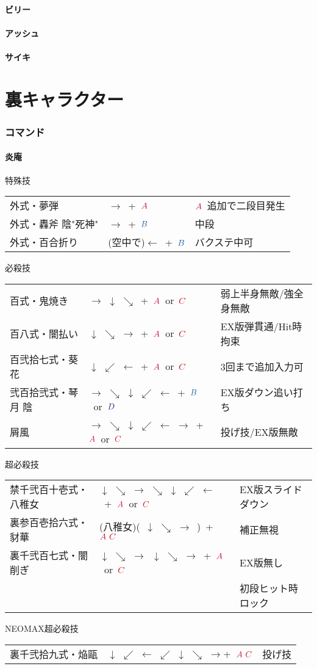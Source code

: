 \documentclass[a4j,11pt]{jarticle}
\def\A{\textcolor{Acolor}{A}}
\def\C{\textcolor{Ccolor}{C}}
\def\B{\textcolor{Bcolor}{B}}
\def\D{\textcolor{Dcolor}{D}}
\def\hado{$\downarrow$ $\searrow$ $\rightarrow$}%
\def\tatsu{$\downarrow$ $\swarrow$ $\leftarrow$}%
\def\syoryu{$\rightarrow$ $\downarrow$ $\searrow$}%
\def\gyakuyoga{$\rightarrow$ $\searrow$ $\downarrow$ $\swarrow$ $\leftarrow$}%
\def\tenti{$\rightarrow$ $\searrow$ $\downarrow$ $\swarrow$ $\leftarrow$ $\rightarrow$}%
\def\ryuko{$\downarrow$ $\searrow$ $\rightarrow$ $\searrow$ $\downarrow$ $\swarrow$ $\leftarrow$}%
\def\orochi{$\downarrow$ $\swarrow$ $\leftarrow$ $\swarrow$ $\downarrow$ $\searrow$ $\rightarrow$}%
\begin{document}
\subsection{ビリー}
\subsection{アッシュ}
\subsection{サイキ}
\newpage
\part{裏キャラクター}%
\section{コマンド}
\subsection{炎庵}
\begin{itembox}[l]{特殊技}
\begin{tabular}{lll}
外式・夢弾&$\rightarrow$\ +\ $\A$&$\A$\ 追加で二段目発生\\
外式・轟斧 陰"死神"&$\rightarrow$\ +\ $\B$&中段\\%
外式・百合折り&(空中で)$\leftarrow$\ +\ $\B$&バクステ中可%
\end{tabular}
\end{itembox}
\begin{itembox}[l]{必殺技}
\begin{tabular}{lll}
百式・鬼焼き&\syoryu\ +\ $\A$\ or\ $\C$&弱上半身無敵/強全身無敵\\%
百八式・闇払い&\hado\ +\ $\A$\ or\ $\C$&EX版弾貫通/Hit時拘束\\%
百弐拾七式・葵花&\tatsu\ +\ $\A$\ or\ $\C$&3回まで追加入力可\\%
弐百拾弐式・琴月 陰&\gyakuyoga\ +\ $\B$\ or\ $\D$&EX版ダウン追い打ち\\%
屑風&\tenti\ +\ $\A$\ or\ $\C$&投げ技/EX版無敵%
\end{tabular}
\end{itembox}
\begin{itembox}[l]{超必殺技}
\begin{tabular}{lll}
禁千弐百十壱式・八稚女&\ryuko\ +\ $\A$\ or\ $\C$&EX版スライドダウン\\%
裏参百壱拾六式・豺華&(八稚女)(\ \hado\ )\times 4\ +\ $\A\ \C$&補正無視\\
裏千弐百七式・闇削ぎ&\hado\ \hado\ +\ $\A$\ or\ $\C$&EX版無し\\
&&初段ヒット時ロック%
\end{tabular}
\end{itembox}
\begin{itembox}[l]{NEOMAX超必殺技}
\begin{tabular}{lll}
裏千弐拾九式・焔甌&\orochi +\ $\A\ \C$&投げ技%
\end{tabular}
\end{itembox}
\newpage
\end{document}
